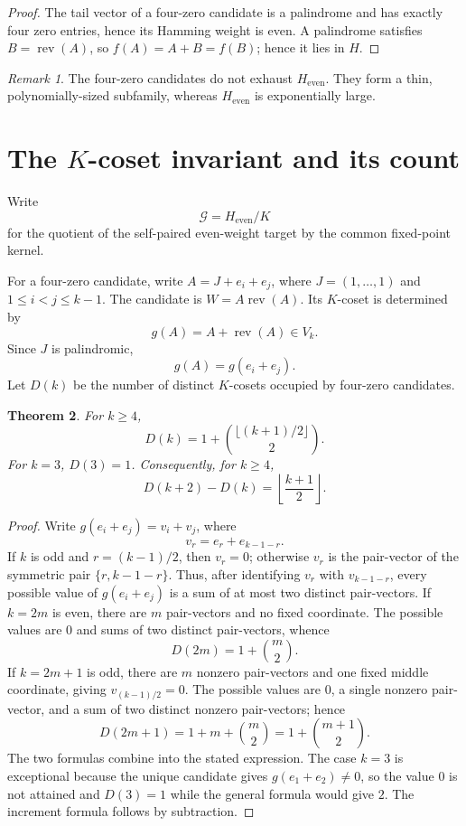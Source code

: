 \documentclass[11pt]{article}
\newtheorem{theorem}{Theorem}[section]
\theoremstyle{definition}
\theoremstyle{remark}
\newtheorem{remark}[theorem]{Remark}
\begin{document}
\begin{proof}
The tail vector of a four-zero candidate is a palindrome and has exactly four zero entries, hence its Hamming weight is even. A palindrome satisfies $B=\operatorname{rev}(A)$, so $f(A)=A+B=f(B)$; hence it lies in $H$.
\end{proof}

\begin{remark}
The four-zero candidates do not exhaust $H_{\mathrm{even}}$. They form a thin, polynomially-sized subfamily, whereas $H_{\mathrm{even}}$ is exponentially large.
\end{remark}

\section{The \texorpdfstring{$K$}{K}-coset invariant and its count}
\label{sec:Kcoset}

Write
\[
\mathcal G=H_{\mathrm{even}}/K
\]
for the quotient of the self-paired even-weight target by the common fixed-point kernel.

For a four-zero candidate, write $A=J+e_i+e_j$, where $J=(1,\ldots,1)$ and $1\le i<j\le k-1$. The candidate is $W=A\operatorname{rev}(A)$. Its $K$-coset is determined by
\[
g(A)=A+\operatorname{rev}(A)\in V_k.
\]
Since $J$ is palindromic,
\[
g(A)=g(e_i+e_j).
\]
Let $D(k)$ be the number of distinct $K$-cosets occupied by four-zero candidates.

\begin{theorem}\label{thm:Dk}
For $k\ge4$,
\[
\boxed{
D(k)=1+\binom{\lfloor (k+1)/2\rfloor}{2}.
}
\]
For $k=3$, $D(3)=1$. Consequently, for $k\ge4$,
\[
D(k+2)-D(k)=\left\lfloor\frac{k+1}{2}\right\rfloor.
\]
\end{theorem}

\begin{proof}
Write \(g(e_i+e_j)=v_i+v_j\), where
\[
v_r=e_r+e_{k-1-r}.
\]
If \(k\) is odd and \(r=(k-1)/2\), then \(v_r=0\); otherwise \(v_r\) is the pair-vector of the symmetric pair \(\{r,k-1-r\}\). Thus, after identifying \(v_r\) with \(v_{k-1-r}\), every possible value of \(g(e_i+e_j)\) is a sum of at most two distinct pair-vectors. If $k=2m$ is even, there are $m$ pair-vectors and no fixed coordinate. The possible values are $0$ and sums of two distinct pair-vectors, whence
\[
D(2m)=1+\binom m2.
\]
If $k=2m+1$ is odd, there are $m$ nonzero pair-vectors and one fixed middle coordinate, giving $v_{(k-1)/2}=0$. The possible values are $0$, a single nonzero pair-vector, and a sum of two distinct nonzero pair-vectors; hence
\[
D(2m+1)=1+m+\binom m2=1+\binom{m+1}{2}.
\]
The two formulas combine into the stated expression. The case $k=3$ is exceptional because the unique candidate gives $g(e_1+e_2)\neq0$, so the value $0$ is not attained and $D(3)=1$ while the general formula would give $2$. The increment formula follows by subtraction.
\end{proof}
\end{document}
